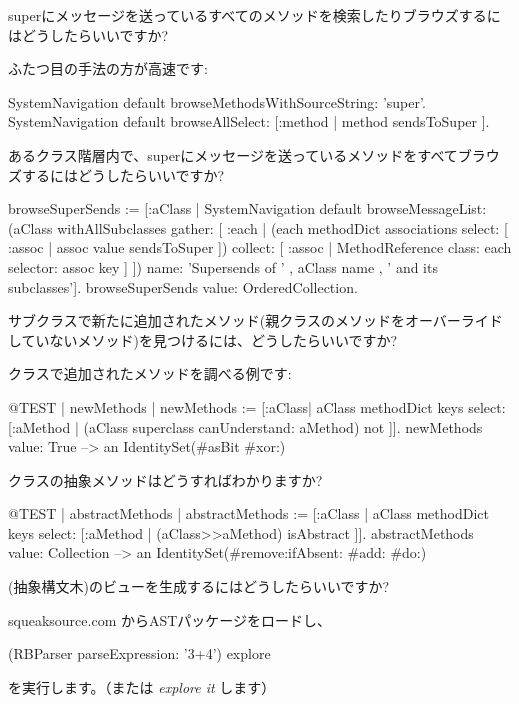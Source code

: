 \documentclass[a4paper,10pt,twoside]{book}
\begin{document}
\begin{faq}
superにメッセージを送っているすべてのメソッドを検索したりブラウズするにはどうしたらいいですか?
\end{faq}
\answer
ふたつ目の手法の方が高速です:
\begin{code}{}
SystemNavigation default browseMethodsWithSourceString: 'super'.
SystemNavigation default browseAllSelect: [:method | method sendsToSuper ].
\end{code}

\begin{faq}
あるクラス階層内で、superにメッセージを送っているメソッドをすべてブラウズするにはどうしたらいいですか?
\end{faq}
\answer
\begin{code}{}
browseSuperSends := [:aClass | SystemNavigation default
	browseMessageList: (aClass withAllSubclasses gather: [ :each |
		(each methodDict associations
			select: [ :assoc | assoc value sendsToSuper ])
				collect: [ :assoc | MethodReference class: each selector: assoc key ] ])
	name: 'Supersends of ' , aClass name , ' and its subclasses'].
browseSuperSends value: OrderedCollection.
\end{code}

\begin{faq}
サブクラスで新たに追加されたメソッド(親クラスのメソッドをオーバーライドしていないメソッド)を見つけるには、どうしたらいいですか?
\end{faq}
\answer
{}クラスで追加されたメソッドを調べる例です:
\begin{code}{@TEST | newMethods |}
newMethods := [:aClass| aClass methodDict keys select:
	[:aMethod | (aClass superclass canUnderstand: aMethod) not ]].
newMethods value: True --> an IdentitySet(#asBit #xor:)
\end{code}

\begin{faq}
クラスの抽象メソッドはどうすればわかりますか?
\end{faq}
\answer
\begin{code}{@TEST | abstractMethods |}
abstractMethods :=
	[:aClass | aClass methodDict keys select:
		[:aMethod | (aClass>>aMethod) isAbstract ]].
abstractMethods value: Collection --> an IdentitySet(#remove:ifAbsent: #add: #do:)
\end{code}

\begin{faq}
(抽象構文木)のビューを生成するにはどうしたらいいですか?
\end{faq}
\answer
squeaksource.com からASTパッケージをロードし、
\begin{code}{}
(RBParser parseExpression: '3+4') explore
\end{code}
を実行します。（または \emph{explore it} します）
\end{document}
